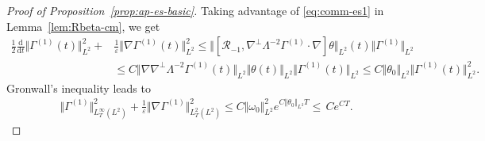 \documentclass[reqno,11pt,a4paper]{amsart}
\newcommand{\dd}{\mathrm{d}}
\begin{document}
\begin{proof}[Proof of Proposition~\ref{prop:ap-es-basic}]
Taking advantage of \eqref{eq:comm-es1} in Lemma~\ref{lem:Rbeta-cm}, we get
\begin{align*}%
  \frac{1}{2} \frac{\dd }{\dd t} \Vert \Gamma^{(1)}(t)\Vert _{L^2}^2 +& \frac{1}{\varepsilon} \Vert \nabla \Gamma^{(1)}(t)\Vert _{L^2}^2
   \leq \Vert [\mathcal{R}_{-1}, \nabla^{\bot}\Lambda^{-2}\Gamma^{(1)}\cdot \nabla]\theta\Vert _{L^2}(t) \Vert \Gamma^{(1)}\Vert _{L^2} \nonumber \\
 & \leq C \Vert \nabla\nabla^{\perp}\Lambda^{-2}\Gamma^{(1)}(t)\Vert _{L^2} \Vert \theta(t)\Vert _{L^2}  \Vert \Gamma^{(1)}(t)\Vert _{L^2}  \leq C \Vert \theta_0\Vert _{L^2}  \Vert \Gamma^{(1)}(t)\Vert ^2_{L^2}. \nonumber 
\end{align*}
Gronwall's inequality leads to
\begin{equation}\label{es:GamL2}
\begin{split}
  \Vert \Gamma^{(1)}\Vert _{L^\infty_T(L^2)}^2 + \frac{1}{\varepsilon} \Vert \nabla \Gamma^{(1)}\Vert _{L^2_T(L^2)}^2 
  \leq C  \Vert \omega_0\Vert _{L^2}^2  e^{C \Vert \theta_0\Vert _{L^2}T} \leq \, C e^{CT}.
\end{split}
\end{equation}


\end{proof}
\end{document}
